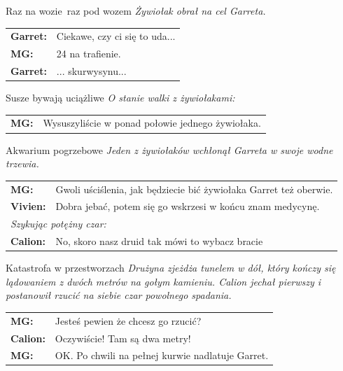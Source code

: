 \documentclass[10pt,twoside,twocolumn]{book}
\begin{document}
\begin{rpg-quotebox}{Raz na wozie\, raz pod wozem}
   \textit{Żywiołak obrał na cel Garreta.}\\
   
   \begin{tabularx}{\columnwidth}{lX}
      \textbf{Garret:} & Ciekawe, czy ci się to uda...\\
      \textbf{MG:} & 24 na trafienie.\\
      \textbf{Garret:} &... skurwysynu...\\
   \end{tabularx}
\end{rpg-quotebox}

\begin{rpg-quotebox}{Susze bywają uciążliwe}
   \textit{O stanie walki z żywiołakami:}\\
   
   \begin{tabularx}{\columnwidth}{lX}
      \textbf{MG:} & Wysuszyliście w ponad połowie jednego żywiołaka.\\
   \end{tabularx}
\end{rpg-quotebox}

\begin{rpg-quotebox}{Akwarium pogrzebowe}
   \textit{Jeden z żywiołaków wchłonął Garreta w swoje wodne trzewia.}\\
   
   \begin{tabularx}{\columnwidth}{lX}
      \textbf{MG:} & Gwoli uściślenia, jak będziecie bić żywiołaka Garret też oberwie.\\
      \textbf{Vivien:} & Dobra jebać, potem się go wskrzesi w końcu znam medycynę.\\
      \multicolumn{2}{l}{\textit{Szykując potężny czar:}}\\
      \textbf{Calion:} & No, skoro nasz druid tak mówi to wybacz bracie\\
   \end{tabularx}
\end{rpg-quotebox}

\begin{rpg-quotebox}{Katastrofa w przestworzach}
   \textit{Drużyna zjeżdża tunelem w dół, który kończy się lądowaniem z dwóch metrów na gołym kamieniu. Calion jechał pierwszy i postanowił rzucić na siebie czar powolnego spadania.}\\
   
   \begin{tabularx}{\columnwidth}{lX}
      \textbf{MG:} & Jesteś pewien że chcesz go rzucić?\\
      \textbf{Calion:} & Oczywiście! Tam są dwa metry!\\
      \textbf{MG:} & OK. Po chwili na pełnej kurwie nadlatuje Garret.\\
   \end{tabularx}
\end{rpg-quotebox}
\end{document}
